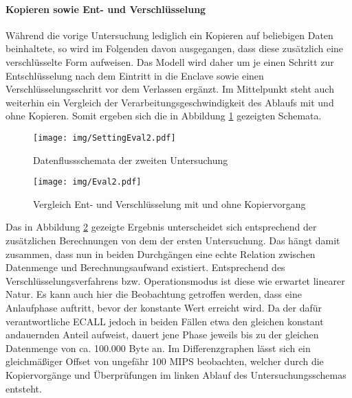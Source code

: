 \paragraph{Kopieren sowie Ent- und Verschlüsselung}

Während die vorige Untersuchung lediglich ein Kopieren auf beliebigen Daten beinhaltete, so wird im Folgenden davon ausgegangen, dass diese zusätzlich eine verschlüsselte Form aufweisen. Das Modell wird daher um je einen Schritt zur Entschlüsselung nach dem Eintritt in die Enclave sowie einen Verschlüsselungsschritt vor dem Verlassen ergänzt. Im Mittelpunkt steht auch weiterhin ein Vergleich der Verarbeitungsgeschwindigkeit des Ablaufs mit und ohne Kopieren. Somit ergeben sich die in Abbildung \ref{fig:settingeval2} gezeigten Schemata.

\begin{figure}[h]
	\texttt{[image: img/SettingEval2.pdf]}
	\centering
	\caption{Datenflussschemata der zweiten Untersuchung}
	\label{fig:settingeval2}
\end{figure}

\begin{figure}[h]
	\texttt{[image: img/Eval2.pdf]}
	\centering
	\caption{Vergleich Ent- und Verschlüsselung mit und ohne Kopiervorgang}
	\label{fig:eval2}
\end{figure}

Das in Abbildung \ref{fig:eval2} gezeigte Ergebnis unterscheidet sich entsprechend der zusätzlichen Berechnungen von dem der ersten Untersuchung. Das hängt damit zusammen, dass nun in beiden Durchgängen eine echte Relation zwischen Datenmenge und Berechnungsaufwand existiert. Entsprechend des Verschlüsselungsverfahrens bzw. Operationsmodus ist diese wie erwartet linearer Natur. Es kann auch hier die Beobachtung getroffen werden, dass eine Anlaufphase auftritt, bevor der konstante Wert erreicht wird. Da der dafür verantwortliche ECALL jedoch in beiden Fällen etwa den gleichen konstant andauernden Anteil aufweist, dauert jene Phase jeweils bis zu der gleichen Datenmenge von ca. 100.000 Byte an. Im Differenzgraphen lässt sich ein gleichmäßiger Offset von ungefähr 100 MIPS beobachten, welcher durch die Kopiervorgänge und Überprüfungen im linken Ablauf des Untersuchungsschemas entsteht.

